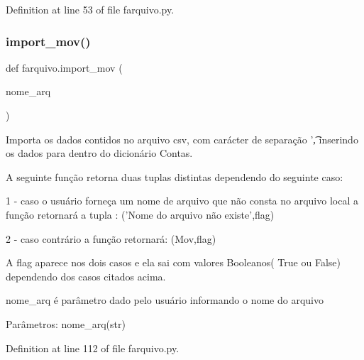 Definition at line 53 of file farquivo.\+py.

\mbox{\label{namespacefarquivo_a7910f4b9636477db0bb1b508c1e9c2aa}} 
\subsubsection{import\_mov()}
{\footnotesize\ttfamily def farquivo.\+import\+\_\+mov (\begin{DoxyParamCaption}\item[{}]{nome\+\_\+arq }\end{DoxyParamCaption})}

\begin{DoxyVerb}Importa os dados contidos no arquivo csv, com carácter de separação '\t, inserindo
os dados para dentro do dicionário Contas.

A seguinte função retorna duas tuplas distintas dependendo do seguinte caso:

1 - caso o usuário forneça um nome de arquivo que não consta no arquivo local a
  função retornará a tupla : ('Nome do arquivo não existe',flag)

2 - caso contrário a função retornará: (Mov,flag)

A flag aparece nos dois casos e ela sai com valores Booleanos( True ou False) dependendo
dos casos citados acima.


nome_arq é parâmetro dado pelo usuário informando o nome do arquivo


Parâmetros:
nome_arq(str)\end{DoxyVerb}
 

Definition at line 112 of file farquivo.\+py.


